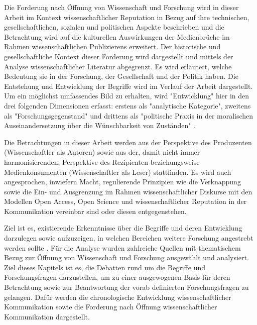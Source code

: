 Die Forderung nach Öffnung von Wissenschaft und Forschung wird in dieser Arbeit im Kontext wissenschaftlicher Reputation in Bezug auf ihre technischen, gesellschaftlichen, sozialen und politischen Aspekte beschrieben und die Betrachtung wird auf die kulturellen Auswirkungen der Medienbrüche im Rahmen wissenschaftlichen Publizierens erweitert. Der historische und gesellschaftliche Kontext dieser Forderung wird dargestellt und mittels der Analyse wissenschaftlicher Literatur abgegrenzt. Es wird erläutert, welche Bedeutung sie in der Forschung, der Gesellschaft und der Politik haben. Die Entstehung und Entwicklung der Begriffe wird im Verlauf der Arbeit dargestellt. Um ein möglichst umfassendes Bild zu erhalten, wird "Entwicklung" hier in den drei folgenden Dimensionen erfasst: erstens als "analytische Kategorie", zweitens als "Forschungsgegenstand" und drittens als "politische Praxis in der moralischen Auseinandersetzung über die Wünschbarkeit von Zuständen" \cite{cite:10}.

Die Betrachtungen in dieser Arbeit werden aus der Perspektive des Produzenten (Wissenschaftler als Autoren) sowie aus der, damit nicht immer harmonisierenden, Perspektive des Rezipienten beziehungsweise Medienkonsumenten (Wissenschaftler als Leser) stattfinden. Es wird auch angesprochen, inwiefern Macht, regulierende Prinzipien wie die Verknappung sowie die Ein- und Ausgrenzung im Rahmen wissenschaftlicher Diskurse mit den Modellen Open Access, Open Science und wissenschaftlicher Reputation in der Kommunikation vereinbar sind oder diesen entgegenstehen.

Ziel ist es, existierende Erkenntnisse über die Begriffe und deren Entwicklung darzulegen sowie aufzuzeigen, in welchen Bereichen weitere Forschung angestrebt werden sollte \cite{webster2002analyzing}. Für die Analyse wurden zahlreiche Quellen mit thematischem Bezug zur Öffnung von Wissenschaft und Forschung ausgewählt und analysiert. Ziel dieses Kapitels ist es, die Debatten rund um die Begriffe und Forschungsfragen darzustellen, um zu einer ausgewogenen Basis für deren Betrachtung sowie zur Beantwortung der vorab definierten Forschungsfragen zu gelangen. Dafür werden die chronologische Entwicklung wissenschaftlicher Kommunikation sowie die Forderung nach Öffnung wissenschaftlicher Kommunikation dargestellt.

